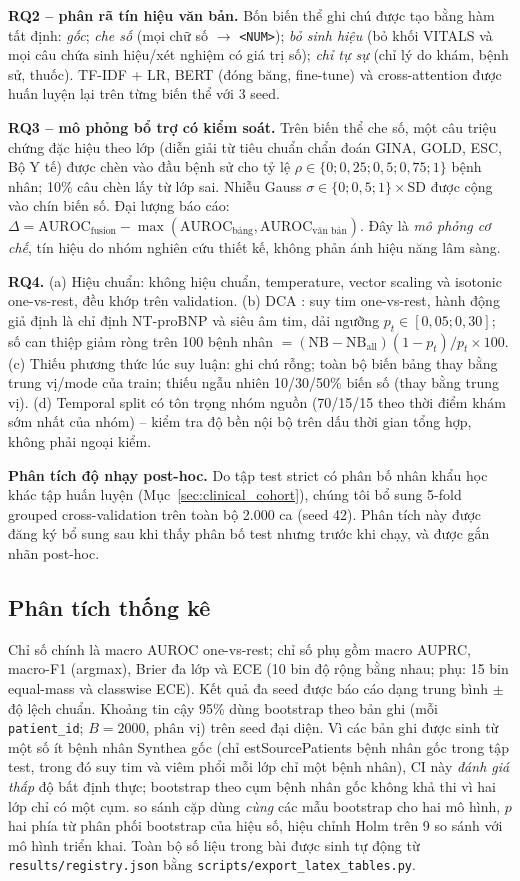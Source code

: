 \textbf{RQ2 -- phân rã tín hiệu văn bản.} Bốn biến thể ghi chú được tạo bằng hàm tất định: \emph{gốc}; \emph{che số} (mọi chữ số $\to$ \texttt{<NUM>}); \emph{bỏ sinh hiệu} (bỏ khối VITALS và mọi câu chứa sinh hiệu/xét nghiệm có giá trị số); \emph{chỉ tự sự} (chỉ lý do khám, bệnh sử, thuốc). TF-IDF + LR, BERT (đóng băng, fine-tune) và cross-attention được huấn luyện lại trên từng biến thể với 3 seed.

\textbf{RQ3 -- mô phỏng bổ trợ có kiểm soát.} Trên biến thể che số, một câu triệu chứng đặc hiệu theo lớp (diễn giải từ tiêu chuẩn chẩn đoán GINA, GOLD, ESC, Bộ Y tế) được chèn vào đầu bệnh sử cho tỷ lệ $\rho\in\{0;0{,}25;0{,}5;0{,}75;1\}$ bệnh nhân; 10\% câu chèn lấy từ lớp sai. Nhiễu Gauss $\sigma\in\{0;0{,}5;1\}\times$SD được cộng vào chín biến số. Đại lượng báo cáo: $\Delta=\text{AUROC}_{\text{fusion}}-\max(\text{AUROC}_{\text{bảng}},\text{AUROC}_{\text{văn bản}})$. Đây là \emph{mô phỏng cơ chế}, tín hiệu do nhóm nghiên cứu thiết kế, không phản ánh hiệu năng lâm sàng.

\textbf{RQ4.} (a) Hiệu chuẩn: không hiệu chuẩn, temperature, vector scaling và isotonic one-vs-rest, đều khớp trên validation. (b) DCA \cite{vickers2006decision,vickers2016netbenefit}: suy tim one-vs-rest, hành động giả định là chỉ định NT-proBNP và siêu âm tim, dải ngưỡng $p_t\in[0{,}05;0{,}30]$; số can thiệp giảm ròng trên 100 bệnh nhân $=(\text{NB}-\text{NB}_{\text{all}})(1-p_t)/p_t\times100$. (c) Thiếu phương thức lúc suy luận: ghi chú rỗng; toàn bộ biến bảng thay bằng trung vị/mode của train; thiếu ngẫu nhiên 10/30/50\% biến số (thay bằng trung vị). (d) Temporal split có tôn trọng nhóm nguồn (70/15/15 theo thời điểm khám sớm nhất của nhóm) -- kiểm tra độ bền nội bộ trên dấu thời gian tổng hợp, không phải ngoại kiểm.

\textbf{Phân tích độ nhạy post-hoc.} Do tập test strict có phân bố nhân khẩu học khác tập huấn luyện (Mục~\ref{sec:clinical_cohort}), chúng tôi bổ sung 5-fold grouped cross-validation trên toàn bộ 2.000 ca (seed 42). Phân tích này được đăng ký bổ sung sau khi thấy phân bố test nhưng trước khi chạy, và được gắn nhãn post-hoc.

\subsection{Phân tích thống kê}
Chỉ số chính là macro AUROC one-vs-rest; chỉ số phụ gồm macro AUPRC, macro-F1 (argmax), Brier đa lớp và ECE (10 bin độ rộng bằng nhau; phụ: 15 bin equal-mass và classwise ECE). Kết quả đa seed được báo cáo dạng trung bình $\pm$ độ lệch chuẩn. Khoảng tin cậy 95\% dùng bootstrap theo bản ghi (mỗi \texttt{patient\_id}; $B=2000$, phân vị) trên seed đại diện. Vì các bản ghi được sinh từ một số ít bệnh nhân Synthea gốc (chỉ 	estSourcePatients{} bệnh nhân gốc trong tập test, trong đó suy tim và viêm phổi mỗi lớp chỉ một bệnh nhân), CI này \emph{đánh giá thấp} độ bất định thực; bootstrap theo cụm bệnh nhân gốc không khả thi vì hai lớp chỉ có một cụm. so sánh cặp dùng \emph{cùng} các mẫu bootstrap cho hai mô hình, $p$ hai phía từ phân phối bootstrap của hiệu số, hiệu chỉnh Holm trên 9 so sánh với mô hình triển khai. Toàn bộ số liệu trong bài được sinh tự động từ \texttt{results/registry.json} bằng \texttt{scripts/export\_latex\_tables.py}.
